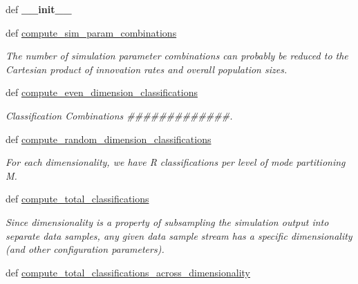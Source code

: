 \begin{DoxyCompactItemize}
\item 
\hypertarget{classctpy_1_1math_1_1simulation__calculations_1_1_simulation_calculations_ab00bd033de015209aba7b2e10f547d5d}{def {\bfseries \-\_\-\-\_\-init\-\_\-\-\_\-}}\label{classctpy_1_1math_1_1simulation__calculations_1_1_simulation_calculations_ab00bd033de015209aba7b2e10f547d5d}

\item 
def \hyperlink{classctpy_1_1math_1_1simulation__calculations_1_1_simulation_calculations_a26e2aee1058529d61399e51767a12460}{compute\-\_\-sim\-\_\-param\-\_\-combinations}
\begin{DoxyCompactList}\small\item\em The number of simulation parameter combinations can probably be reduced to the Cartesian product of innovation rates and overall population sizes. \end{DoxyCompactList}\item 
def \hyperlink{classctpy_1_1math_1_1simulation__calculations_1_1_simulation_calculations_af4774a281ed7c5b5c80a0440b6d12949}{compute\-\_\-even\-\_\-dimension\-\_\-classifications}
\begin{DoxyCompactList}\small\item\em Classification Combinations \#\#\#\#\#\#\#\#\#\#\#\#\#. \end{DoxyCompactList}\item 
def \hyperlink{classctpy_1_1math_1_1simulation__calculations_1_1_simulation_calculations_a8f9ffc30a7e7c68dca35021e193fcad0}{compute\-\_\-random\-\_\-dimension\-\_\-classifications}
\begin{DoxyCompactList}\small\item\em For each dimensionality, we have R classifications per level of mode partitioning M. \end{DoxyCompactList}\item 
def \hyperlink{classctpy_1_1math_1_1simulation__calculations_1_1_simulation_calculations_a8b960cd6d285a6de588321c02c00cb77}{compute\-\_\-total\-\_\-classifications}
\begin{DoxyCompactList}\small\item\em Since dimensionality is a property of subsampling the simulation output into separate data samples, any given data sample stream has a specific dimensionality (and other configuration parameters). \end{DoxyCompactList}\item 
def \hyperlink{classctpy_1_1math_1_1simulation__calculations_1_1_simulation_calculations_ad455df8e83ed3d3bc0fba5edbca5b79c}{compute\-\_\-total\-\_\-classifications\-\_\-across\-\_\-dimensionality}

\end{DoxyCompactItemize}
